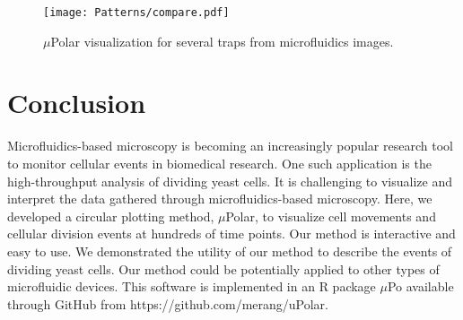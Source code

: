 \documentclass[conference]{IEEEtran}
\begin{document}
 

\begin{figure}
\centering
\texttt{[image: Patterns/compare.pdf]}
\caption{  $\mu$Polar visualization for several traps from microfluidics images.}
\label{fig:polar}
\end{figure}

\section{Conclusion}
Microfluidics-based microscopy is becoming an increasingly popular research tool to monitor cellular events in biomedical research. One such application is the high-throughput analysis of dividing yeast cells. It is challenging to visualize and interpret the data gathered through microfluidics-based microscopy. Here, we developed a circular plotting method, $\mu$Polar, to visualize cell movements and cellular division events at hundreds of time points. Our method is interactive and easy to use. We demonstrated the utility of our method to describe the events of dividing yeast cells. Our method could be potentially applied to other types of microfluidic devices.
This software is implemented in an R package $\mu$Po available through GitHub from https://github.com/merang/uPolar.



 






\end{document}
